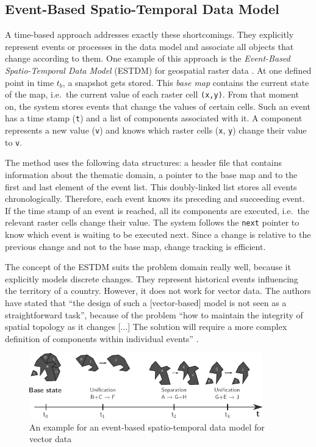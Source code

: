 \subsection{Event-Based Spatio-Temporal Data Model} %
\label{sub:event_based_spatio_temporal_data_model}

A time-based approach addresses exactly these shortcomings. They explicitly represent events or processes in the data model and associate all objects that change according to them. One example of this approach is the \emph{Event-Based Spatio-Temporal Data Model} (ESTDM) for geospatial raster data \cite{peuquet95}.
At one defined point in time $t_b$, a snapshot gets stored. This \emph{base map} contains the current state of the map, i.e.\ the current value of each raster cell \texttt{(x,y)}. From that moment on, the system stores events that change the values of certain cells. Such an event has a time stamp (\texttt{t}) and a list of components associated with it. A component represents a new value (\texttt{v}) and knows which raster cells (\texttt{x}, \texttt{y}) change their value to \texttt{v}.

The method uses the following data structures: a header file that contains information about the thematic domain, a pointer to the base map and to the first and last element of the event list. This doubly-linked list stores all events chronologically. Therefore, each event knows its preceding and succeeding event. If the time stamp of an event is reached, all its components are executed, i.e.\ the relevant raster cells change their value. The system follows the \texttt{next} pointer to know which event is waiting to be executed next. Since a change is relative to the previous change and not to the base map, change tracking is efficient.

The concept of the ESTDM suits the problem domain really well, because it explicitly models discrete changes. They represent historical events influencing the territory of a country. However, it does not work for vector data. The authors have stated that ``the design of such a [vector-based] model is not seen as a straightforward task'', because of the problem ``how to maintain the integrity of spatial topology as it changes [...] The solution will require a more complex definition of components within individual events''
\cite[p. 21]{peuquet95}.

\begin{figure}[H]
  \vspace{1em}
  \centering
  \includegraphics[width=0.9\textwidth]{graphics/basics/stdm/event-based_spatio-temporal_data_model}
  \caption{An example for an event-based spatio-temporal data model for vector data}
  \label{fig:event-based_spatio-temporal_data_model}
\end{figure}

